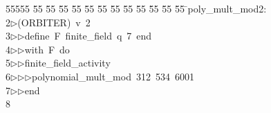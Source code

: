 %
%
\begin{tabbing}
55555 \= 55 \= 55 \= 55 \= 55 \= 55 \= 55 \= 55 \= 55 \= 55 \= 55 \= 55 \= 55 \= \>poly\_mult\_mod2:\\[0pt]
2\>$\triangleright$\>(ORBITER)\ v\ 2\ \\[0pt]
3\>$\triangleright$\>$\triangleright$\>define\ F\ finite\_field\ q\ 7\ end\ \\[0pt]
4\>$\triangleright$\>$\triangleright$\>with\ F\ do\ \\[0pt]
5\>$\triangleright$\>$\triangleright$\>finite\_field\_activity\ \\[0pt]
6\>$\triangleright$\>$\triangleright$\>$\triangleright$\>polynomial\_mult\_mod\ 312\ 534\ 6001\ \\[0pt]
7\>$\triangleright$\>$\triangleright$\>end\\[0pt]
8\>\end{tabbing}
